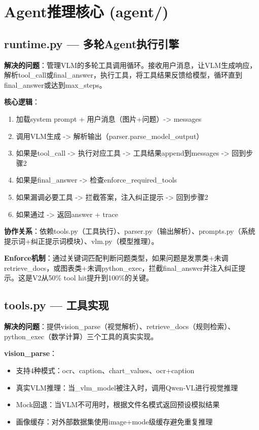 \documentclass[fontset=none,11pt,a4paper]{ctexart}
\begin{document}
\section{Agent推理核心 (agent/)}

\subsection{runtime.py --- 多轮Agent执行引擎}

\textbf{解决的问题}：管理VLM的多轮工具调用循环。接收用户消息，让VLM生成响应，解析tool\_call或final\_answer，执行工具，将工具结果反馈给模型，循环直到final\_answer或达到max\_steps。

\textbf{核心逻辑}：
\begin{enumerate}[nosep]
    \item 加载system prompt + 用户消息（图片+问题）-> messages
    \item 调用VLM生成 -> 解析输出（parser.parse\_model\_output）
    \item 如果是tool\_call -> 执行对应工具 -> 工具结果append到messages -> 回到步骤2
    \item 如果是final\_answer -> 检查enforce\_required\_tools
    \item 如果漏调必要工具 -> 拦截答案，注入纠正提示 -> 回到步骤2
    \item 如果通过 -> 返回answer + trace
\end{enumerate}

\textbf{协作关系}：依赖tools.py（工具执行）、parser.py（输出解析）、prompts.py（系统提示词+纠正提示词模块）、vlm.py（模型推理）。

\textbf{Enforce机制}：通过关键词匹配判断问题类型，如果问题是发票类+未调retrieve\_docs，或图表类+未调python\_exec，拦截final\_answer并注入纠正提示。这是V2从50\% tool hit提升到100\%的关键。

\subsection{tools.py --- 工具实现}

\textbf{解决的问题}：提供vision\_parse（视觉解析）、retrieve\_docs（规则检索）、python\_exec（数学计算）三个工具的真实实现。

\textbf{vision\_parse}：
\begin{itemize}[nosep]
    \item 支持4种模式：ocr、caption、chart\_values、ocr+caption
    \item 真实VLM推理：当\_vlm\_model被注入时，调用Qwen-VL进行视觉推理
    \item Mock回退：当VLM不可用时，根据文件名模式返回预设模拟结果
    \item 画像缓存：对外部数据集使用image+mode级缓存避免重复推理
\end{itemize}
\end{document}
